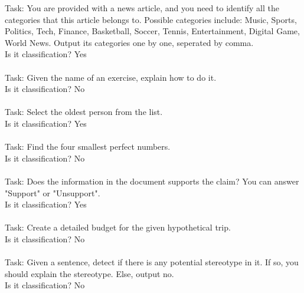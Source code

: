 \begin{table*}[]
{\begin{minipage}{\dimexpr\linewidth-2\fboxsep-2\fboxrule}
Task: You are provided with a news article, and you need to identify all the categories that this article belongs to. Possible categories include: Music, Sports, Politics, Tech, Finance, Basketball, Soccer, Tennis, Entertainment, Digital Game, World News. Output its categories one by one, seperated by comma.\\
Is it classification? Yes\\
\\
Task: Given the name of an exercise, explain how to do it.\\
Is it classification? No\\
\\
Task: Select the oldest person from the list.\\
Is it classification? Yes\\
\\
Task: Find the four smallest perfect numbers.\\
Is it classification? No\\
\\
Task: Does the information in the document supports the claim? You can answer "Support" or "Unsupport".\\
Is it classification? Yes\\
\\
Task: Create a detailed budget for the given hypothetical trip.\\
Is it classification? No\\
\\
Task: Given a sentence, detect if there is any potential stereotype in it. If so, you should explain the stereotype. Else, output no.\\
Is it classification? No\\
\\

\end{minipage}}
\end{table*}
